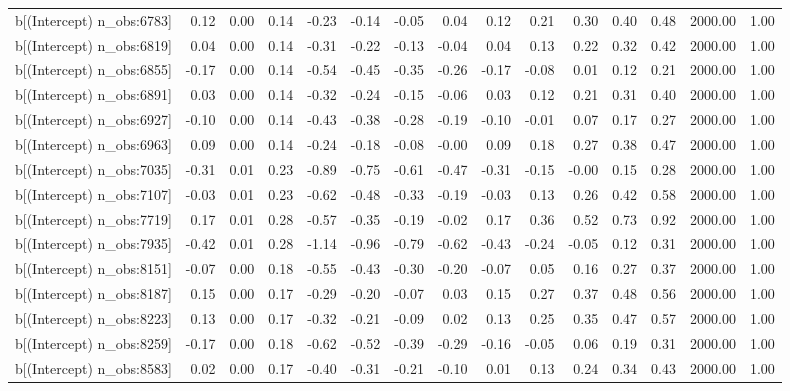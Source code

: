 \begin{table}[ht]
\begin{tabular}{rrrrrrrrrrrrrrr}
  b[(Intercept) n\_obs:6783] & 0.12 & 0.00 & 0.14 & -0.23 & -0.14 & -0.05 & 0.04 & 0.12 & 0.21 & 0.30 & 0.40 & 0.48 & 2000.00 & 1.00 \\ 
  b[(Intercept) n\_obs:6819] & 0.04 & 0.00 & 0.14 & -0.31 & -0.22 & -0.13 & -0.04 & 0.04 & 0.13 & 0.22 & 0.32 & 0.42 & 2000.00 & 1.00 \\ 
  b[(Intercept) n\_obs:6855] & -0.17 & 0.00 & 0.14 & -0.54 & -0.45 & -0.35 & -0.26 & -0.17 & -0.08 & 0.01 & 0.12 & 0.21 & 2000.00 & 1.00 \\ 
  b[(Intercept) n\_obs:6891] & 0.03 & 0.00 & 0.14 & -0.32 & -0.24 & -0.15 & -0.06 & 0.03 & 0.12 & 0.21 & 0.31 & 0.40 & 2000.00 & 1.00 \\ 
  b[(Intercept) n\_obs:6927] & -0.10 & 0.00 & 0.14 & -0.43 & -0.38 & -0.28 & -0.19 & -0.10 & -0.01 & 0.07 & 0.17 & 0.27 & 2000.00 & 1.00 \\ 
  b[(Intercept) n\_obs:6963] & 0.09 & 0.00 & 0.14 & -0.24 & -0.18 & -0.08 & -0.00 & 0.09 & 0.18 & 0.27 & 0.38 & 0.47 & 2000.00 & 1.00 \\ 
  b[(Intercept) n\_obs:7035] & -0.31 & 0.01 & 0.23 & -0.89 & -0.75 & -0.61 & -0.47 & -0.31 & -0.15 & -0.00 & 0.15 & 0.28 & 2000.00 & 1.00 \\ 
  b[(Intercept) n\_obs:7107] & -0.03 & 0.01 & 0.23 & -0.62 & -0.48 & -0.33 & -0.19 & -0.03 & 0.13 & 0.26 & 0.42 & 0.58 & 2000.00 & 1.00 \\ 
  b[(Intercept) n\_obs:7719] & 0.17 & 0.01 & 0.28 & -0.57 & -0.35 & -0.19 & -0.02 & 0.17 & 0.36 & 0.52 & 0.73 & 0.92 & 2000.00 & 1.00 \\ 
  b[(Intercept) n\_obs:7935] & -0.42 & 0.01 & 0.28 & -1.14 & -0.96 & -0.79 & -0.62 & -0.43 & -0.24 & -0.05 & 0.12 & 0.31 & 2000.00 & 1.00 \\ 
  b[(Intercept) n\_obs:8151] & -0.07 & 0.00 & 0.18 & -0.55 & -0.43 & -0.30 & -0.20 & -0.07 & 0.05 & 0.16 & 0.27 & 0.37 & 2000.00 & 1.00 \\ 
  b[(Intercept) n\_obs:8187] & 0.15 & 0.00 & 0.17 & -0.29 & -0.20 & -0.07 & 0.03 & 0.15 & 0.27 & 0.37 & 0.48 & 0.56 & 2000.00 & 1.00 \\ 
  b[(Intercept) n\_obs:8223] & 0.13 & 0.00 & 0.17 & -0.32 & -0.21 & -0.09 & 0.02 & 0.13 & 0.25 & 0.35 & 0.47 & 0.57 & 2000.00 & 1.00 \\ 
  b[(Intercept) n\_obs:8259] & -0.17 & 0.00 & 0.18 & -0.62 & -0.52 & -0.39 & -0.29 & -0.16 & -0.05 & 0.06 & 0.19 & 0.31 & 2000.00 & 1.00 \\ 
  b[(Intercept) n\_obs:8583] & 0.02 & 0.00 & 0.17 & -0.40 & -0.31 & -0.21 & -0.10 & 0.01 & 0.13 & 0.24 & 0.34 & 0.43 & 2000.00 & 1.00 \\ 

\end{tabular}
\end{table}
